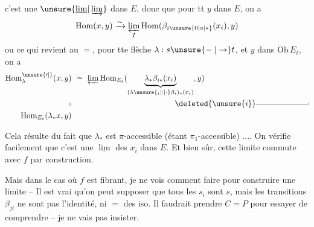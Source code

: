   c'est une $\unsure{\underline{\lim}|\varinjlim}$ dans $E$, donc que pour tt $y$ dans $E$, on a
\[ \mathrm{Hom}(x,y)\xrightarrow{\sim}\varprojlim_I\mathrm{Hom}(\beta_{i\unsure{0|\circ|*}}(x_i),y) \]
ou ce qui revient au $=$, pour tte flèche $\lambda:s\unsure{\relbar|\to}t$, et $y$ dans $\mathrm{Ob}\,E_t$, on a
\[ \begin{aligned}
\mathrm{Hom}^{\unsure{\prime|{}}}_\lambda(x,y)&\ \overset{\sim}{\relbar}\ \varprojlim\mathrm{Hom}_{E_t}(\underbrace{\lambda_*\beta_{i*}(x_i)}_{(\lambda\unsure{{}_i|:|\cdot}\beta_i)_*(x_i)},y)\\
\shortparallel &\hspace{13em}\deleted{\unsure{i}}\rule[.45ex]{6.6em}{.35pt}\rule[.45ex]{.35pt}{.5ex}\\
\mathrm{Hom}_{E_t}(\lambda_*x,y)&
\end{aligned} \]

Cela résulte  du fait que $\lambda_*$ est $\pi$-accessible (étant $\pi_1$-accessible) .... On vérifie facilement que c'est une $\underline{\lim}$ des $x_i$ dans $E$. Et bien sûr, cette limite commute avec $f$ par construction.

Mais dans le cas où $f$ est fibrant, je ne vois comment faire pour construire une limite   -- Il est vrai qu'on peut  supposer que tous les $s_i$ sont $s$, mais les transitions $\beta_{ji}$ ne sont pas l'identité, ni $=$ des iso. Il faudrait prendre $C=P$ pour essayer de comprendre -- je ne vais pas insister.


